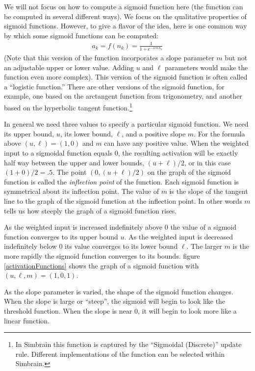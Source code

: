    We will not focus on how to compute a sigmoid function here (the function can be computed in several different ways). We focus on 
the qualitative properties of sigmoid functions. However, to give a flavor of 
the idea, here is one common way by which some sigmoid functions can be 
computed: 
\begin{eqnarray*}
a_k = f(n_k) = \frac{1}{1+e^{-4\, m\, n_k}}
\end{eqnarray*}
(Note that this version of the function incorporates a slope parameter $m$ but not an adjustable upper or lower value. Adding $u$ and $\ell$ parameters would make the function even more complex). This version of the sigmoid function is often called a ``logistic function.''  There are other versions of the sigmoid function, for example, one based on the arctangent function from trigonometry, and another based on the hyperbolic tangent function.\footnote{In Simbrain this function is captured by the ``Sigmoidal (Discrete)'' update rule. Different implementations of the function can be selected within Simbrain.} 

In general we need three values to specify a particular sigmoid function. We 
need its upper bound, $u$, its lower bound, $\ell$, and a positive slope $m$. 
For the formula above $(u,\ell) = (1,0)$ and $m$ can have any positive value.
   When the weighted input to a sigmoidal function equals $0$, the resulting activation will be exactly half way 
between the upper and lower bounds, \ie $(u + \ell)/2$, or in this case $(1+0)/2 = .5$. 
The point $(0,  (u + \ell)/2)$ on the graph of the sigmoid function is called the {\em 
inflection point} of the function. Each sigmoid function is symmetrical about
its inflection point. The value of $m$ is the slope of the tangent line to the 
graph of the sigmoid function at the inflection point. In other words $m$ 
tells us how steeply the graph of a sigmoid function rises.

   As the weighted input is increased indefinitely above $0$ the value of a 
sigmoid function converges to its upper bound $u$. As the weighted input is 
decreased indefinitely below $0$ its value converges to its lower bound $\ell$.
The larger $m$ is the more rapidly the sigmoid function converges to its 
bounds. figure \ref{activationFunctions} shows the graph of a sigmoid function with 
$(u,\ell,m) = (1,0,1)$. 

As the slope parameter is varied, the shape of the sigmoid function changes. When the slope is
large or ``steep'', the sigmoid will begin to look like the threshold function. When the slope is near 0, it will begin to look more like a linear function.